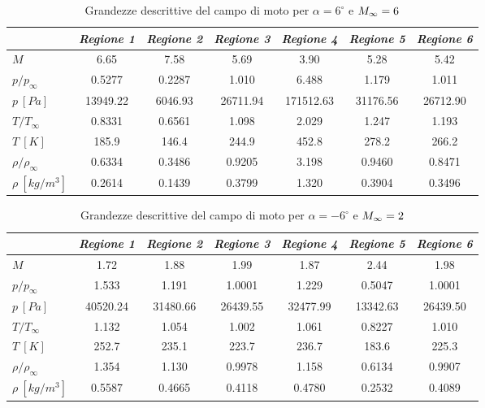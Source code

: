 \begin{table} [H]
	\centering 
	\begin{tabular}{l  c  c c c c c}    
		\toprule&
		\emph{Regione 1}& \emph{Regione 2}& \emph{Regione 3}& \emph{Regione 4}& \emph{Regione 5}& \emph{Regione 6}   \\  \midrule
		$M$  & 6.65  & 7.58  & 5.69  & 3.90  & 5.28  & 5.42 \\
		$p/p_{\infty}$  & 0.5277  & 0.2287  & 1.010  & 6.488  & 1.179  & 1.011 \\
		$p \ [\si{Pa}]$  & 13949.22  & 6046.93  & 26711.94  & 171512.63  & 31176.56  & 26712.90 \\
		$T/T_{\infty}$  & 0.8331 & 0.6561 & 1.098 & 2.029 & 1.247 & 1.193\\
		$T \ [\si{K}]$  & 185.9 & 146.4 & 244.9 & 452.8 & 278.2 & 266.2\\
		$\rho/\rho_{\infty}$  & 0.6334 & 0.3486 & 0.9205 & 3.198 & 0.9460 & 0.8471\\
		$\rho \ [\si{kg/m^3}]$  & 0.2614 & 0.1439 & 0.3799 & 1.320 & 0.3904 & 0.3496\\
		\bottomrule
	\end{tabular}
	\caption {\footnotesize Grandezze descrittive del campo di moto per $\alpha=6^\circ$ e $M_ {\infty}=6$}
	\label{tabS8}
\end{table}	


\begin{table} [H]
	\centering 
	\begin{tabular}{l  c  c c c c c}    
		\toprule&   
		\emph{Regione 1}& \emph{Regione 2}& \emph{Regione 3}& \emph{Regione 4}& \emph{Regione 5}& \emph{Regione 6}   \\  \midrule
		$M$  & 1.72  & 1.88  & 1.99  & 1.87  & 2.44  & 1.98 \\
		$p/p_{\infty}$  & 1.533  & 1.191  & 1.0001  & 1.229  & 0.5047  & 1.0001 \\
		$p \ [\si{Pa}]$  & 40520.24  & 31480.66  & 26439.55  & 32477.99  & 13342.63  & 26439.50 \\
		$T/T_{\infty}$  & 1.132 & 1.054 & 1.002 & 1.061 & 0.8227 & 1.010\\
		$T \ [\si{K}]$  & 252.7 & 235.1 & 223.7 & 236.7 & 183.6 & 225.3\\
		$\rho/\rho_{\infty}$  & 1.354 & 1.130 & 0.9978 & 1.158 & 0.6134 & 0.9907\\
		$\rho \ [\si{kg/m^3}]$  & 0.5587 & 0.4665 & 0.4118 & 0.4780 & 0.2532 & 0.4089\\
		\bottomrule\end{tabular}
	\caption {\footnotesize Grandezze descrittive del campo di moto per $\alpha=-6^\circ$ e $M_ {\infty}=2$}
	\label{tabS9}
\end{table}			

